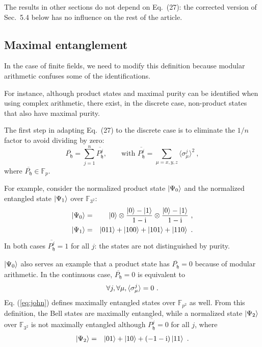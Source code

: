 \documentclass{iopart}
\newcommand{\ComplexI}{\text{i}}
\newcommand{\ff}[1]{\mathbb{F}_{#1}}
\def\fh{\mathfrak{h}}
\begin{document}
\bigskip The results in other sections do not depend on Eq.~(27): the corrected version of Sec.~5.4 below has no influence on the rest of the article. 

\subsection{Maximal entanglement}


In the case of finite fields, we need to modify this definition because modular arithmetic confuses some of the identifications. 



For instance, although product states and maximal purity can be identified when using complex arithmetic, there exist, in the discrete case, non-product states that also have maximal purity. 

The first step in adapting Eq.~(27) to the discrete case is to eliminate the $1/n$ factor to avoid dividing by zero: 
\begin{equation}
\overline{P_{\fh}}=\sum\limits _{j=1}^{n}\overline{P_{\fh}^{j}}, \qquad\mbox{with~}
\overline{P_{\fh}^j} = \sum\limits _{\mu=x,y,z}\langle\sigma_{\mu}^{j}\rangle^{2}\ ,
\end{equation}
where $\overline{P_{\fh}}\in\ff{p}$. 

For example, consider the normalized product state $\ket{\Psi_{0}}$ and the normalized entangled 
state $\ket{\Psi_{1}}$ over $\ff{3^{2}}$: 
\begin{eqnarray}
\ket{\Psi_{0}} & = & \ket{0}\otimes\frac{\ket{0}-\ket{1}}{1-\ComplexI}\otimes\frac{\ket{0}-\ket{1}}{1-\ComplexI}\ ,\\
\ket{\Psi_{1}} & = & \ket{011}+\ket{100}+\ket{101}+\ket{110}\ .
\end{eqnarray}
In both cases $\overline{P_{\fh}^j} = 1$ for all $j$: the states are not distinguished by purity. 

$\ket{\Psi_{0}}$ also serves an example that a product state has
$\overline{P_{\fh}}=0$ because of modular arithmetic. In the continuous
case, $\overline{P_{\fh}}=0$ is equivalent to 
\begin{equation}
\forall j,\forall\mu,\braket{\sigma_{\mu}^{j}}=0\label{eq:john}\ .
\end{equation}
Eq. (\ref{eq:john}) defines maximally entangled states over $\ff{p^{2}}$
as well. From this definition, the Bell states are maximally entangled,
while a normalized state $\ket{\Psi_{2}}$ over $\ff{3^{2}}$ is not maximally entangled although $\overline{P_{\fh}^{j}}=0$ for all $j$, where
\begin{eqnarray}
\ket{\Psi_{2}} & = & \ket{01}+\ket{10}+\left(-1-\ComplexI\right)\ket{11}\ .
\end{eqnarray}
\end{document}
